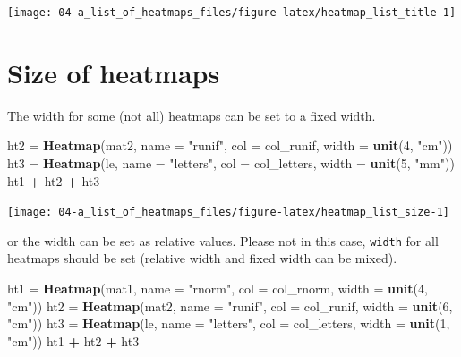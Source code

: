 \documentclass[]{book}
\newenvironment{Shaded}{\begin{snugshade}}{\end{snugshade}}
\newcommand{\KeywordTok}[1]{\textcolor[rgb]{0.13,0.29,0.53}{\textbf{#1}}}
\newcommand{\DataTypeTok}[1]{\textcolor[rgb]{0.13,0.29,0.53}{#1}}
\newcommand{\DecValTok}[1]{\textcolor[rgb]{0.00,0.00,0.81}{#1}}
\newcommand{\StringTok}[1]{\textcolor[rgb]{0.31,0.60,0.02}{#1}}
\newcommand{\OperatorTok}[1]{\textcolor[rgb]{0.81,0.36,0.00}{\textbf{#1}}}
\newcommand{\NormalTok}[1]{#1}
\theoremstyle{definition}
\theoremstyle{definition}
\theoremstyle{definition}
\theoremstyle{remark}
\begin{document}
\begin{center}\texttt{[image: 04-a\_list\_of\_heatmaps\_files/figure-latex/heatmap\_list\_title-1]} \end{center}

\section{Size of heatmaps}\label{size-of-heatmaps}

The width for some (not all) heatmaps can be set to a fixed width.

\begin{Shaded}
\begin{Highlighting}[]
\NormalTok{ht2 =}\StringTok{ }\KeywordTok{Heatmap}\NormalTok{(mat2, }\DataTypeTok{name =} \StringTok{"runif"}\NormalTok{, }\DataTypeTok{col =}\NormalTok{ col_runif, }\DataTypeTok{width =} \KeywordTok{unit}\NormalTok{(}\DecValTok{4}\NormalTok{, }\StringTok{"cm"}\NormalTok{))}
\NormalTok{ht3 =}\StringTok{ }\KeywordTok{Heatmap}\NormalTok{(le, }\DataTypeTok{name =} \StringTok{"letters"}\NormalTok{, }\DataTypeTok{col =}\NormalTok{ col_letters, }\DataTypeTok{width =} \KeywordTok{unit}\NormalTok{(}\DecValTok{5}\NormalTok{, }\StringTok{"mm"}\NormalTok{))}
\NormalTok{ht1 }\OperatorTok{+}\StringTok{ }\NormalTok{ht2 }\OperatorTok{+}\StringTok{ }\NormalTok{ht3}
\end{Highlighting}
\end{Shaded}

\begin{center}\texttt{[image: 04-a\_list\_of\_heatmaps\_files/figure-latex/heatmap\_list\_size-1]} \end{center}

or the width can be set as relative values. Please not in this case,
\texttt{width} for all heatmaps should be set (relative width and fixed
width can be mixed).

\begin{Shaded}
\begin{Highlighting}[]
\NormalTok{ht1 =}\StringTok{ }\KeywordTok{Heatmap}\NormalTok{(mat1, }\DataTypeTok{name =} \StringTok{"rnorm"}\NormalTok{, }\DataTypeTok{col =}\NormalTok{ col_rnorm, }\DataTypeTok{width =} \KeywordTok{unit}\NormalTok{(}\DecValTok{4}\NormalTok{, }\StringTok{"cm"}\NormalTok{))}
\NormalTok{ht2 =}\StringTok{ }\KeywordTok{Heatmap}\NormalTok{(mat2, }\DataTypeTok{name =} \StringTok{"runif"}\NormalTok{, }\DataTypeTok{col =}\NormalTok{ col_runif, }\DataTypeTok{width =} \KeywordTok{unit}\NormalTok{(}\DecValTok{6}\NormalTok{, }\StringTok{"cm"}\NormalTok{))}
\NormalTok{ht3 =}\StringTok{ }\KeywordTok{Heatmap}\NormalTok{(le, }\DataTypeTok{name =} \StringTok{"letters"}\NormalTok{, }\DataTypeTok{col =}\NormalTok{ col_letters, }\DataTypeTok{width =} \KeywordTok{unit}\NormalTok{(}\DecValTok{1}\NormalTok{, }\StringTok{"cm"}\NormalTok{))}
\NormalTok{ht1 }\OperatorTok{+}\StringTok{ }\NormalTok{ht2 }\OperatorTok{+}\StringTok{ }\NormalTok{ht3}
\end{Highlighting}
\end{Shaded}
\end{document}
